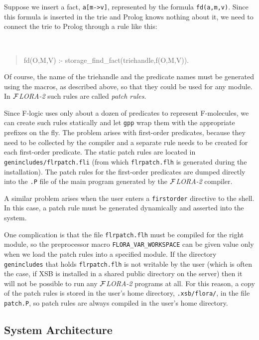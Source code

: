 \documentclass[11pt]{article}
\newcommand{\FLORA}{{\mbox{${\cal F}${\small\it LORA}\rm\emph{-2}}}\xspace}
\newcommand{\fl}{\mbox{F-logic}\xspace}
\begin{document}
Suppose we insert a fact, {\tt a[m->v]}, represented by the formula
{\tt fd(a,m,v)}. Since this formula is inserted in the trie and Prolog knows
nothing about it, we need to connect the trie to Prolog through a rule like
this:
{\tt
\begin{quote}
  fd(O,M,V) :- storage\_find\_fact(triehandle,f(O,M,V)).
\end{quote}
}
Of course, the name of the triehandle and the predicate names must be
generated using the macros, as described above, so that they could be used
for any module. In \FLORA such rules are called \emph{patch rules}. 

Since \fl uses only about a dozen of predicates to represent
F-molecules, we can create such rules statically and let {\tt gpp} wrap
them with the appropriate prefixes on the fly.
The problem arises with first-order predicates, because they need
to be collected by the compiler and a separate rule needs to be created for
each first-order predicate. The static patch rules are located in
{\tt genincludes/flrpatch.fli} (from which {\tt flrpatch.flh} is generated
during the installation).  The patch rules for the first-order
predicates are dumped directly into the {\tt .P} file of the main program
generated by the \FLORA compiler.

A similar problem arises when the user enters a {\tt firstorder} directive
to the shell. In this case, a patch rule must be generated dynamically and
asserted into the system.

One complication is that the file {\tt flrpatch.flh} must be compiled for
the right module, so the preprocessor macro {\tt FLORA\_VAR\_WORKSPACE} can
be given value only when we load the patch rules into a specified module.
If the directory {\tt genincludes} that holds {\tt flrpatch.flh} is not
writable by the user (which is often the case, if XSB is installed in a
shared public directory on the server) then it will not be possible to run
any \FLORA programs at all. For this reason, a copy of the patch rules is
stored in the user's home directory, {\tt .xsb/flora/}, in the file {\tt
  patch.P}, so patch rules are always compiled in the user's home
directory.


\subsection{System Architecture}
\end{document}

